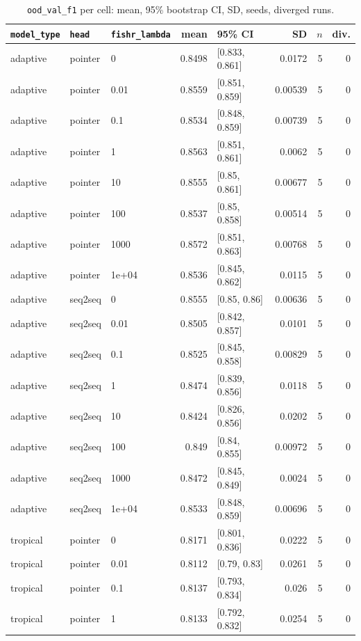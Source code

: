 \documentclass[10pt]{article}
\begin{document}
{\small
\begin{longtable}{lllrlrrr}
\caption{\texttt{ood\_val\_f1} per cell: mean, 95\% bootstrap CI, SD, seeds, diverged runs.}\label{tab:summary-ood_val_f1}\\
\toprule
\texttt{model\_type} & \texttt{head} & \texttt{fishr\_lambda} & mean & 95\% CI & SD & $n$ & div.\\
\midrule
\endhead
adaptive & pointer & 0 & 0.8498 & [0.833, 0.861] & 0.0172 & 5 & 0\\
adaptive & pointer & 0.01 & 0.8559 & [0.851, 0.859] & 0.00539 & 5 & 0\\
adaptive & pointer & 0.1 & 0.8534 & [0.848, 0.859] & 0.00739 & 5 & 0\\
adaptive & pointer & 1 & 0.8563 & [0.851, 0.861] & 0.0062 & 5 & 0\\
adaptive & pointer & 10 & 0.8555 & [0.85, 0.861] & 0.00677 & 5 & 0\\
adaptive & pointer & 100 & 0.8537 & [0.85, 0.858] & 0.00514 & 5 & 0\\
adaptive & pointer & 1000 & 0.8572 & [0.851, 0.863] & 0.00768 & 5 & 0\\
adaptive & pointer & 1e+04 & 0.8536 & [0.845, 0.862] & 0.0115 & 5 & 0\\
adaptive & seq2seq & 0 & 0.8555 & [0.85, 0.86] & 0.00636 & 5 & 0\\
adaptive & seq2seq & 0.01 & 0.8505 & [0.842, 0.857] & 0.0101 & 5 & 0\\
adaptive & seq2seq & 0.1 & 0.8525 & [0.845, 0.858] & 0.00829 & 5 & 0\\
adaptive & seq2seq & 1 & 0.8474 & [0.839, 0.856] & 0.0118 & 5 & 0\\
adaptive & seq2seq & 10 & 0.8424 & [0.826, 0.856] & 0.0202 & 5 & 0\\
adaptive & seq2seq & 100 & 0.849 & [0.84, 0.855] & 0.00972 & 5 & 0\\
adaptive & seq2seq & 1000 & 0.8472 & [0.845, 0.849] & 0.0024 & 5 & 0\\
adaptive & seq2seq & 1e+04 & 0.8533 & [0.848, 0.859] & 0.00696 & 5 & 0\\
tropical & pointer & 0 & 0.8171 & [0.801, 0.836] & 0.0222 & 5 & 0\\
tropical & pointer & 0.01 & 0.8112 & [0.79, 0.83] & 0.0261 & 5 & 0\\
tropical & pointer & 0.1 & 0.8137 & [0.793, 0.834] & 0.026 & 5 & 0\\
tropical & pointer & 1 & 0.8133 & [0.792, 0.832] & 0.0254 & 5 & 0\\

\end{longtable}}
\end{document}
